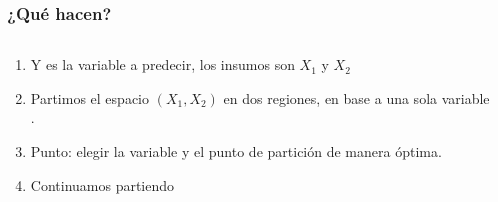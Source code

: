 \documentclass[
  shownotes,
  xcolor={svgnames},
  hyperref={colorlinks,citecolor=DarkBlue,linkcolor=andesred,urlcolor=DarkBlue}
  , aspectratio=169]{beamer}
\begin{document}
\begin{frame}[fragile]
\frametitle{¿Qué hacen?}


\begin{columns}[T] %
\begin{column}{.48\textwidth}
  
\begin{enumerate}
    \footnotesize
\item Y es la variable a predecir, los insumos son $X_1$ y $X_2$
\medskip
\item  Partimos el espacio $(X_1,X_2)$ en dos regiones, en base a una sola variable .
\medskip
\item Punto: elegir la variable y el punto de partición de manera óptima.
\medskip
\item Continuamos partiendo
\end{enumerate}


\end{column}  
\hfill
\begin{column}{.52\textwidth}

\end{column}
\end{columns}

\end{frame}
\end{document}
